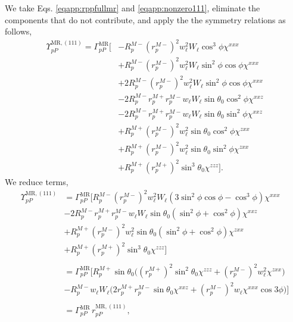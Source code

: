 We take Eqs. \eqref{eqapp:rppfullmr} and \eqref{eqapp:nonzero111}, eliminate the
components that do not contribute, and apply the the symmetry relations as
follows,
\begin{equation*}
\begin{split}
\Upsilon^{\mathrm{MR},(111)}_{pP} =
\Gamma^{\mathrm{MR}}_{pP}
\bigg[
&- R^{M-}_{p}\left(r^{M-}_{p}\right)^{2}w^{2}_{\ell}W_{\ell}
   \cos^{3}\phi\chi^{xxx}\\
&+ R^{M-}_{p}\left(r^{M-}_{p}\right)^{2}w^{2}_{\ell}W_{\ell}
   \sin^{2}\phi\cos\phi\chi^{xxx}\\
&+ 2R^{M-}_{p}\left(r^{M-}_{p}\right)^{2}w^{2}_{\ell}W_{\ell}
   \sin^{2}\phi\cos\phi\chi^{xxx}\\
&- 2R^{M-}_{p}r^{M+}_{p}r^{M-}_{p}w_{\ell}W_{\ell}
   \sin\theta_{0}\cos^{2}\phi\chi^{xxz}\\
&- 2R^{M-}_{p}r^{M+}_{p}r^{M-}_{p}w_{\ell}W_{\ell}
   \sin\theta_{0}\sin^{2}\phi\chi^{xxz}\\
&+ R^{M+}_{p}\left(r^{M-}_{p}\right)^{2}w^{2}_{\ell}
   \sin\theta_{0}\cos^{2}\phi\chi^{zxx}\\
&+ R^{M+}_{p}\left(r^{M-}_{p}\right)^{2}w^{2}_{\ell}
   \sin\theta_{0}\sin^{2}\phi\chi^{zxx}\\
&+ R^{M+}_{p}\left(r^{M+}_{p}\right)^{2}\sin^{3}\theta_{0}\chi^{zzz}
\bigg].
\end{split}
\end{equation*}
We reduce terms,
\begin{equation*}
\begin{split}
\Upsilon^{\mathrm{MR},(111)}_{pP} &=
\Gamma^{\mathrm{MR}}_{pP}
\big[
R^{M-}_{p}\left(r^{M-}_{p}\right)^{2}w^{2}_{\ell}W_{\ell}
  (3\sin^{2}\phi\cos\phi - \cos^{3}\phi)\chi^{xxx}\\
&- 2R^{M-}_{p}r^{M+}_{p}r^{M-}_{p}w_{\ell}W_{\ell}\sin\theta_{0}
  (\sin^{2}\phi + \cos^{2}\phi)\chi^{xxz}\\
&+ R^{M+}_{p}\left(r^{M-}_{p}\right)^{2}w^{2}_{\ell}\sin\theta_{0}
  (\sin^{2}\phi + \cos^{2}\phi)\chi^{zxx}\\
&+ R^{M+}_{p}\left(r^{M+}_{p}\right)^{2}\sin^{3}\theta_{0}\chi^{zzz}
\big]\\\\
&=
\Gamma^{\mathrm{MR}}_{pP}
\bigg[
R^{M+}_{p}\sin\theta_{0}
\Big(
  \left(r^{M+}_{p}\right)^{2}\sin^{2}\theta_{0}\chi^{zzz}
+ \left(r^{M-}_{p}\right)^{2}w^{2}_{\ell}\chi^{zxx}
\Big)\\
&- R^{M-}_{p}w_{\ell}W_{\ell}
\Big(
  2r^{M+}_{p}r^{M-}_{p}\sin\theta_{0}\chi^{xxz}
+ \left(r^{M-}_{p}\right)^{2}w_{\ell}\chi^{xxx}\cos3\phi
\Big)
\bigg]\\\\
& = \Gamma^{\mathrm{MR}}_{pP}\,r^{\mathrm{MR},(111)}_{pP},
\end{split}
\end{equation*}
